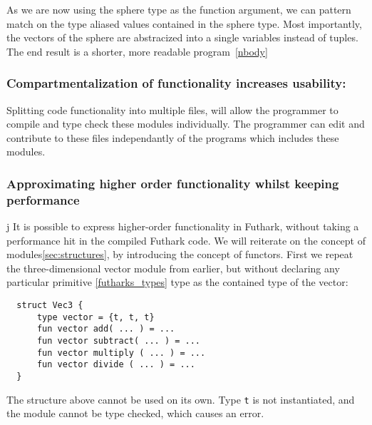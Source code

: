 \noindent As we are now using the sphere type as the function argument, we can pattern
match on the type aliased values contained in the sphere type.
Most importantly, the vectors of the sphere are abstracized into a single variables
instead of tuples.
\\
The end result is a shorter, more readable program~\ref{nbody}

\subsubsection{Compartmentalization of functionality increases usability:}
Splitting code functionality into multiple files, will allow the programmer to
compile and type check these modules individually. The programmer can edit and
contribute to these files independantly of the programs which includes these
modules.

\subsubsection{Approximating higher order functionality whilst keeping performance}
\label{subsec:higherorderfunctionality}j
It is possible to express higher-order functionality in Futhark, without taking
a performance hit in the compiled Futhark code.
We will reiterate on the concept of modules\ref{sec:structures}, by introducing
the concept of functors.
First we repeat the three-dimensional vector module
from earlier, but without declaring any particular
primitive \ref{futharks_types} type as the contained type of the vector:
\begin{verbatim}
  struct Vec3 {
      type vector = {t, t, t}
      fun vector add( ... ) = ...
      fun vector subtract( ... ) = ...
      fun vector multiply ( ... ) = ...
      fun vector divide ( ... ) = ...
  }
\end{verbatim}
\noindent
The structure above cannot be used on its own. Type \texttt{t} is not
instantiated, and the module cannot be type checked, which causes an error.

